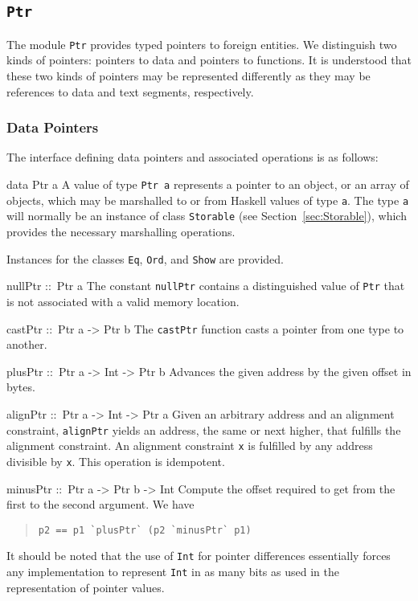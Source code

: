 \documentclass[a4paper,twoside]{article}
\makeatletter
\newcommand{\code}[1]{\texttt{#1}}      %
\newenvironment{codedesc}{%
  \list{}{\labelwidth\z@
    \let\makelabel\codedesclabel}
  }{%
  \endlist
  }
\newcommand*{\codedesclabel}[1]{%
  \hspace{-\leftmargin}
  \parbox[b]{\labelwidth}{\makebox[0pt][l]{\code{#1}}\\}\hfil\relax
  }
\makeatother
\begin{document}
\subsection{\code{Ptr}}
\label{sec:Ptr}

The module \code{Ptr} provides typed pointers to foreign entities.  We
distinguish two kinds of pointers: pointers to data and pointers to functions.
It is understood that these two kinds of pointers may be represented
differently as they may be references to data and text segments, respectively.

\subsubsection{Data Pointers}

The interface defining data pointers and associated operations is as follows:
%
\begin{codedesc}
\item[data Ptr a] A value of type \code{Ptr a} represents a pointer to an
  object, or an array of objects, which may be marshalled to or from Haskell
  values of type \code{a}.  The type \code{a} will normally be an instance of
  class \code{Storable} (see Section~\ref{sec:Storable}), which provides the
  necessary marshalling operations.

  Instances for the classes \code{Eq}, \code{Ord}, and \code{Show} are
  provided. 
\item[nullPtr ::\ Ptr a] The constant \code{nullPtr} contains a distinguished
  value of \code{Ptr} that is not associated with a valid memory location.
\item[castPtr ::\ Ptr a -> Ptr b] The \code{castPtr} function casts a pointer
  from one type to another.
\item[plusPtr ::\ Ptr a -> Int -> Ptr b] Advances the given address by the
  given offset in bytes.
\item[alignPtr ::\ Ptr a -> Int -> Ptr a] Given an arbitrary address and an
  alignment constraint, \code{alignPtr} yields an address, the same or next
  higher, that fulfills the alignment constraint. An alignment constraint
  \code{x} is fulfilled by any address divisible by \code{x}. This operation
  is idempotent.
\item[minusPtr ::\ Ptr a -> Ptr b -> Int] Compute the offset required to get
  from the first to the second argument.  We have
  \begin{quote}
\begin{verbatim}
p2 == p1 `plusPtr` (p2 `minusPtr` p1)
\end{verbatim}
  \end{quote}
\end{codedesc}
%
It should be noted that the use of \code{Int} for pointer differences
essentially forces any implementation to represent \code{Int} in as many bits
as used in the representation of pointer values.
\end{document}
